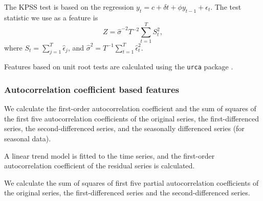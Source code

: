 \documentclass[11pt,a4paper,]{article}
\theoremstyle{definition}
\theoremstyle{definition}
\theoremstyle{definition}
\theoremstyle{remark}
\begin{document}
The KPSS test is based on the regression
\(y_t=c+\delta t+\phi y_{t-1}+\epsilon_t\). The test statistic we use as
a feature is \[
  Z= \hat{\sigma}^{-2} T^{-2}\sum_{t=1}^{T}S_t^2,
\] where \(S_t=\sum_{j=1}^T\hat{\epsilon}_j\), and
\(\hat{\sigma}^2 = T^{-1}\sum_{t=1}^{T} \hat\epsilon_t^2\).

Features based on unit root tests are calculated using the \texttt{urca}
package \autocite{pfaff2016package}.

\subsubsection*{Autocorrelation coefficient based
features}\label{autocorrelation-coefficient-based-features}

We calculate the first-order autocorrelation coefficient and the sum of
squares of the first five autocorrelation coefficients of the original
series, the first-differenced series, the second-differenced series, and
the seasonally differenced series (for seasonal data).

A linear trend model is fitted to the time series, and the first-order
autocorrelation coefficient of the residual series is calculated.

We calculate the sum of squares of first five partial autocorrelation
coefficients of the original series, the first-differenced series and
the second-differenced series.

\clearpage

\printbibliography[title=References]
\end{document}
